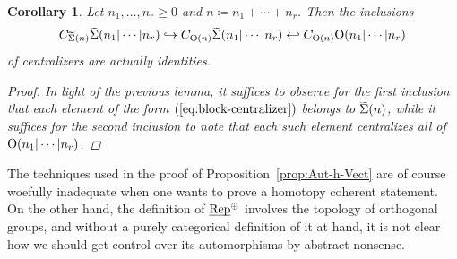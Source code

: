 \documentclass[reqno]{memo-l}
\theoremstyle{mythm}
\newtheorem{cor}[thm]{Corollary}
\theoremstyle{definition}
\numberwithin{equation}{section}
\renewcommand{\O}{{\textup{O}}}
\newcommand{\Sig}{\smash{\widetilde{\vphantom{t}\smash{\Sigma}}}}
\newcommand{\ulhelper}[2]{\underline{\setbox0=\hbox{$#1#2$}\dp0=0.4pt \box0\relax}}
\newcommand{\ul}[1]{{\mathpalette\ulhelper{#1}}\hbox{\rule[-2pt]{0pt}{0pt}}}
\newcommand{\Vect}{\textup{Rep}}
\begin{document}
\begin{cor}\label{cor:so-many-centralizers}
    Let $n_1,\dots,n_r\ge0$ and $n\coloneqq n_1+\cdots+n_r$. Then the inclusions
    \[
        C_{\Sig(n)}\Sig(n_1|\cdots|n_r)\hookrightarrow
        C_{\O(n)}\Sig(n_1|\cdots|n_r)\hookleftarrow
        C_{\O(n)}\O(n_1|\cdots|n_r)
    \]
    of centralizers are actually identities.
    \begin{proof}
        In light of the previous lemma, it suffices to observe for the first inclusion that each element of the form $(\ref{eq:block-centralizer})$ belongs to $\Sig(n)$, while it suffices for the second inclusion to note that each such element centralizes all of $\O(n_1|\cdots|n_r)$.
    \end{proof}
\end{cor}

The techniques used in the proof of Proposition~\ref{prop:Aut-h-Vect} are of course woefully inadequate when one wants to prove a homotopy coherent statement. On the other hand, the definition of $\ul\Vect^\oplus$ involves the topology of orthogonal groups, and without a purely categorical definition of it at hand, it is not clear how we should get control over its automorphisms by abstract nonsense.
\end{document}
